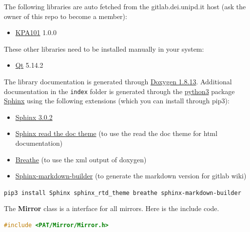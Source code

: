 
The following libraries are auto fetched from the gitlab.dei.unipd.it
host (ask the owner of this repo to become a member):

\begin{itemize}
  \tightlist
  \item
        \href{https://gitlab.dei.unipd.it/PAT/KPA101.git}{KPA101} 1.0.0
\end{itemize}

These other libraries need to be installed manually in your system:

\begin{itemize}
  \tightlist
  \item
        \href{https://www.qt.io/}{Qt} 5.14.2
\end{itemize}

The library documentation is generated through
\href{http://www.doxygen.nl/download.html}{Doxygen 1.8.13}. Additional
documentation in the \texttt{index} folder is generated through the
\href{https://www.anaconda.com/products/individual}{python3} package
\href{https://www.sphinx-doc.org/en/master/}{Sphinx} using the following
extensions (which you can install through pip3):

\begin{itemize}
  \tightlist
  \item
        \href{https://pypi.org/project/Sphinx/}{Sphinx 3.0.2}
  \item
        \href{https://sphinx-rtd-theme.readthedocs.io/en/stable/}{Sphinx read
          the doc theme} (to use the read the doc theme for html documentation)
  \item
        \href{https://pypi.org/project/breathe/}{Breathe} (to use the xml
        output of doxygen)
  \item
        \href{https://pypi.org/project/sphinx-markdown-builder/}{Sphinx-markdown-builder}
        (to generate the markdown version for gitlab wiki)
\end{itemize}

\texttt{pip3\ install\ Sphinx\ sphinx\_rtd\_theme\ breathe\ sphinx-markdown-builder}



The \textbf{Mirror} class is a interface for all mirrors. Here is the
include code.

\begin{lstlisting}[language=c++, gobble=2]
  #include <PAT/Mirror/Mirror.h>
\end{lstlisting}

